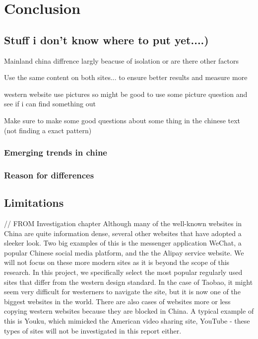 
\chapter{Conclusion} %

\label{Chapter9} %




\section{Stuff i don't know where to put yet....)}
Mainland china diffrence largly beacuse of isolation or are there other factors

Use the same content on both sites... to ensure better results and measure more

western website use pictures so might be good to use some picture question and see if i can find something out

Make sure to make some good questions about some thing in the chinese text (not finding a exact pattern)
 \subsection{Emerging trends in chine}
 \subsection{Reason for differences}
 \section{Limitations}
// FROM Investigation chapter
Although many of the well-known websites in China are quite information dense, several other websites that have adopted a sleeker look. Two big examples of this is the messenger application WeChat, a popular Chinese social media platform, and the the Alipay service website. We will not focus on these more modern sites as it is beyond the scope of this research. In this project, we specifically select the most popular regularly used sites that differ from the western design standard. In the case of Taobao, it might seem very difficult for westerners to navigate the site, but it is now one of the biggest websites in the world. There are also cases of websites more or less copying western websites because they are blocked in China. A typical example of this is Youku, which mimicked the American video sharing site, YouTube - these types of sites will not be investigated in this report either.




